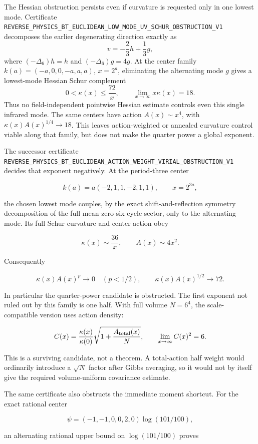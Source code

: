 \documentclass[11pt]{article}
\theoremstyle{definition}
\theoremstyle{remark}
\newcommand{\cert}[1]{\nolinkurl{#1}}
\begin{document}
The Hessian obstruction persists even if curvature is requested only in one
lowest mode.  Certificate
\cert{REVERSE_PHYSICS_BT_EUCLIDEAN_LOW_MODE_UV_SCHUR_OBSTRUCTION_V1}
decomposes the earlier degenerating direction exactly as
\[
 v=-\frac23h+\frac13g,
\]
where \((-\Delta_6)h=h\) and \((-\Delta_6)g=4g\).  At the center family
\(k(a)=(-a,0,0,-a,a,a)\), \(x=2^a\), eliminating the alternating mode \(g\)
gives a lowest-mode Hessian Schur complement
\[
 0<\kappa(x)\leq\frac{72}{x},\qquad
 \lim_{x\to\infty}x\kappa(x)=18.
\]
Thus no field-independent pointwise Hessian estimate controls even this
single infrared mode.  The same centers have action \(A(x)\sim x^4\), with
\(\kappa(x)A(x)^{1/4}\to18\).  This leaves action-weighted or annealed
curvature control viable along that family, but does not make the quarter
power a global exponent.

The successor certificate
\cert{REVERSE_PHYSICS_BT_EUCLIDEAN_ACTION_WEIGHT_VIRIAL_OBSTRUCTION_V1}
decides that exponent negatively.  At the period-three center

\[
 k(a)=a(-2,1,1,-2,1,1),\qquad x=2^{3a},
\]

the chosen lowest mode couples, by the exact shift-and-reflection symmetry
decomposition of the full mean-zero six-cycle sector, only to the alternating
mode.  Its full Schur curvature and center action obey

\[
 \kappa(x)\sim\frac{36}{x},\qquad A(x)\sim4x^2.
\]

Consequently

\[
 \kappa(x)A(x)^p\longrightarrow0\quad(p<1/2),\qquad
 \kappa(x)A(x)^{1/2}\longrightarrow72.
\]

In particular the quarter-power candidate is obstructed.  The first exponent
not ruled out by this family is one half.  With full volume \(N=6^4\), the
scale-compatible version uses action density:

\[
 C(x)=\frac{\kappa(x)}{\kappa(0)}
       \sqrt{1+\frac{A_{\rm total}(x)}N},
 \qquad \lim_{x\to\infty}C(x)^2=6.
\]

This is a surviving candidate, not a theorem.  A total-action half weight
would ordinarily introduce a \(\sqrt N\) factor after Gibbs averaging, so it
would not by itself give the required volume-uniform covariance estimate.

The same certificate also obstructs the immediate moment shortcut.  For the
exact rational center

\[
 \psi=(-1,-1,0,0,2,0)\log(101/100),
\]

an alternating rational upper bound on \(\log(101/100)\) proves
\end{document}
